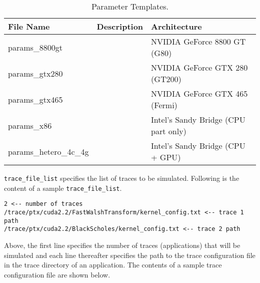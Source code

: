 
\begin{table}
\begin{footnotesize}
\begin{center}
\caption{Parameter Templates.}
\label{table:param}
\begin{tabular}{|l|l|l|}
\hline
File Name              & Description & Architecture                         \\ \hline \hline
params\_8800gt         &             & NVIDIA GeForce 8800 GT (G80)         \\
params\_gtx280         &             & NVIDIA GeForce GTX 280 (GT200)       \\
params\_gtx465         &             & NVIDIA GeForce GTX 465 (Fermi)       \\
params\_x86            &             & Intel's Sandy Bridge (CPU part only) \\
params\_hetero\_4c\_4g &             & Intel's Sandy Bridge (CPU + GPU)     \\ \hline
\end{tabular}
\end{center}
\end{footnotesize}
\end{table}


\Verb+trace_file_list+ specifies the list of traces to be simulated. Following is the
content of a sample \Verb+trace_file_list+.

\begin{Verbatim}
2 <-- number of traces
/trace/ptx/cuda2.2/FastWalshTransform/kernel_config.txt <-- trace 1 path
/trace/ptx/cuda2.2/BlackScholes/kernel_config.txt <-- trace 2 path
\end{Verbatim}

\noindent

Above, the first line specifies the number of traces (applications) that will
be simulated and each line thereafter specifies the path to the trace
configuration file in the trace directory of an application. The contents of a
sample trace configuration file are shown below.

